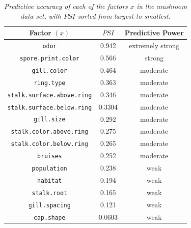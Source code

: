 \documentclass[12pt]{article}
\begin{document}
\begin{itemize}
\begin{itemize}
\end{itemize}

\begin{table}[t!]

\centering

\caption{\textit{Predictive accuracy of each of the factors $x$ in the mushroom data set, with $PSI$ sorted from largest to smallest.}}

\bigskip

\begin{tabular}{c|cc}

Factor $( x )$ & $PSI$ & Predictive Power \\

\hline

\texttt{odor} & 0.942 & extremely strong \\ 

\texttt{spore.print.color} & 0.566 & strong \\ 

\texttt{gill.color} & 0.464 & moderate \\

\texttt{ring.type} & 0.363 & moderate \\ 

\texttt{stalk.surface.above.ring} & 0.346 & moderate \\ 

\texttt{stalk.surface.below.ring} & 0.3304 & moderate \\ 

\texttt{gill.size} & 0.292 & moderate \\

\texttt{stalk.color.above.ring} & 0.275 & moderate \\

\texttt{stalk.color.below.ring} & 0.265 & moderate \\

\texttt{bruises} & 0.252 & moderate \\

\texttt{population} & 0.238 & weak \\ 

\texttt{habitat} & 0.194 & weak \\

\texttt{stalk.root} & 0.165 & weak \\

\texttt{gill.spacing} & 0.121 & weak \\

\texttt{cap.shape} & 0.0603 & weak \\


\end{tabular}
\end{table}
\end{itemize}
\end{document}
